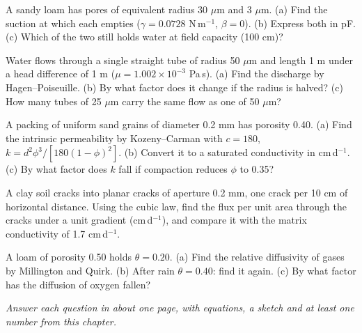 \begin{exlist}
\item A sandy loam has pores of equivalent radius 30 $\mu$m and 3 $\mu$m. (a) Find the suction at which each empties ($\gamma=0.0728$ N\,m$^{-1}$, $\beta=0$). (b) Express both in pF. (c) Which of the two still holds water at field capacity (100 cm)?
\item Water flows through a single straight tube of radius 50 $\mu$m and length 1 m under a head difference of 1 m ($\mu=1.002\times10^{-3}$ Pa\,s). (a) Find the discharge by Hagen--Poiseuille. (b) By what factor does it change if the radius is halved? (c) How many tubes of 25 $\mu$m carry the same flow as one of 50 $\mu$m?
\item A packing of uniform sand grains of diameter 0.2 mm has porosity 0.40. (a) Find the intrinsic permeability by Kozeny--Carman with $c=180$, $k=d^2\phi^3/[180(1-\phi)^2]$. (b) Convert it to a saturated conductivity in cm\,d$^{-1}$. (c) By what factor does $k$ fall if compaction reduces $\phi$ to 0.35?
\item A clay soil cracks into planar cracks of aperture 0.2 mm, one crack per 10 cm of horizontal distance. Using the cubic law, find the flux per unit area through the cracks under a unit gradient (cm\,d$^{-1}$), and compare it with the matrix conductivity of 1.7 cm\,d$^{-1}$.
\item A loam of porosity 0.50 holds $\theta=0.20$. (a) Find the relative diffusivity of gases by Millington and Quirk. (b) After rain $\theta=0.40$: find it again. (c) By what factor has the diffusion of oxygen fallen?
\end{exlist}
{\small\itshape Answer each question in about one page, with equations, a sketch and at least one number from this chapter.}\par\vspace{3pt}

